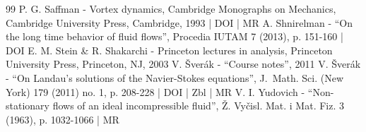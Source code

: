 \documentclass[10pt]{amsart}
\theoremstyle{plain}
\theoremstyle{definition}
\begin{document}
\begin{thebibliography}{99}
P. G. Saffman - Vortex dynamics, Cambridge Monographs on Mechanics, Cambridge University Press, Cambridge, 1993 | DOI | MR
A. Shnirelman - “On the long time behavior of fluid flows”, Procedia IUTAM 7 (2013), p. 151-160 | DOI
E. M. Stein \& R. Shakarchi - Princeton lectures in analysis, Princeton University Press, Princeton, NJ, 2003
V. Šverák - “Course notes”, 2011
V. Šverák - “On Landau’s solutions of the Navier-Stokes equations”, J. Math. Sci. (New York) 179 (2011) no. 1, p. 208-228 | DOI | Zbl | MR
V. I. Yudovich - “Non-stationary flows of an ideal incompressible fluid”, Ž. Vyčisl. Mat. i Mat. Fiz. 3 (1963), p. 1032-1066 | MR
\end{thebibliography}
\end{document}
